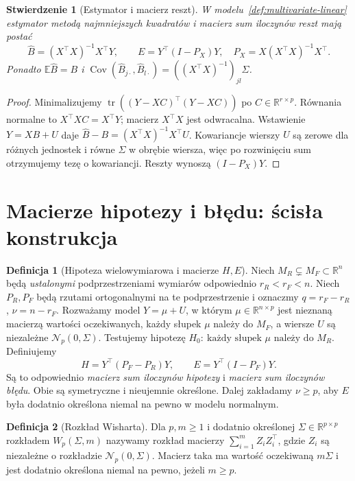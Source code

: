 \documentclass[11pt,a4paper,oneside]{report}
\numberwithin{equation}{chapter}
\theoremstyle{plain}
\newtheorem{stwierdzenie}[twierdzenie]{Stwierdzenie}
\theoremstyle{definition}
\newtheorem{definicja}{Definicja}[chapter]
\theoremstyle{remark}
\newcommand{\R}{\mathbb R}
\newcommand{\E}{\mathbb E}
\newcommand{\Cov}{\operatorname{Cov}}
\newcommand{\Normal}{\mathcal N}
\begin{document}
\begin{stwierdzenie}[Estymator i macierz reszt]\label{prop:multiv-ols}
W modelu~\ref{def:multivariate-linear} estymator metodą najmniejszych kwadratów i macierz sum iloczynów reszt mają postać
\[
 \widehat B=(X^\top X)^{-1}X^\top Y,\qquad E=Y^\top(I-P_X)Y,\quad P_X=X(X^\top X)^{-1}X^\top.
\]
Ponadto $\E\widehat B=B$ i $\Cov(\widehat B_{j\cdot},\widehat B_{l\cdot})=((X^\top X)^{-1})_{jl}\Sigma$.
\end{stwierdzenie}
\begin{proof}
Minimalizujemy $\operatorname{tr}((Y-XC)^\top(Y-XC))$ po $C\in\R^{r\times p}$. Równania normalne to $X^\top XC=X^\top Y$; macierz $X^\top X$ jest odwracalna. Wstawienie $Y=XB+U$ daje $\widehat B-B=(X^\top X)^{-1}X^\top U$. Kowariancje wierszy $U$ są zerowe dla różnych jednostek i równe $\Sigma$ w obrębie wiersza, więc po rozwinięciu sum otrzymujemy tezę o kowariancji. Reszty wynoszą $(I-P_X)Y$.
\end{proof}

\section{Macierze hipotezy i błędu: ścisła konstrukcja}
\begin{definicja}[Hipoteza wielowymiarowa i macierze $H,E$]\label{def:manova-he}
Niech $M_R\subsetneq M_F\subset\R^n$ będą \emph{ustalonymi} podprzestrzeniami wymiarów odpowiednio $r_R<r_F<n$. Niech $P_R,P_F$ będą rzutami ortogonalnymi na te podprzestrzenie i oznaczmy $q=r_F-r_R$, $\nu=n-r_F$. Rozważamy model $Y=\mu+U$, w którym $\mu\in\R^{n\times p}$ jest nieznaną macierzą wartości oczekiwanych, każdy słupek $\mu$ należy do $M_F$, a wiersze $U$ są niezależne $\Normal_p(0,\Sigma)$. Testujemy hipotezę $H_0:\ \text{każdy słupek }\mu\text{ należy do }M_R$. Definiujemy
\[
 H=Y^\top(P_F-P_R)Y,\qquad E=Y^\top(I-P_F)Y.
\]
Są to odpowiednio \emph{macierz sum iloczynów hipotezy} i \emph{macierz sum iloczynów błędu}. Obie są symetryczne i nieujemnie określone. Dalej zakładamy $\nu\ge p$, aby $E$ była dodatnio określona niemal na pewno w modelu normalnym.
\end{definicja}

\begin{definicja}[Rozkład Wisharta]\label{def:wishart-manova}
Dla $p,m\ge1$ i dodatnio określonej $\Sigma\in\R^{p\times p}$ rozkładem $W_p(\Sigma,m)$ nazywamy rozkład macierzy $\sum_{i=1}^m Z_iZ_i^\top$, gdzie $Z_i$ są niezależne o rozkładzie $\Normal_p(0,\Sigma)$. Macierz taka ma wartość oczekiwaną $m\Sigma$ i jest dodatnio określona niemal na pewno, jeżeli $m\ge p$.
\end{definicja}
\end{document}
